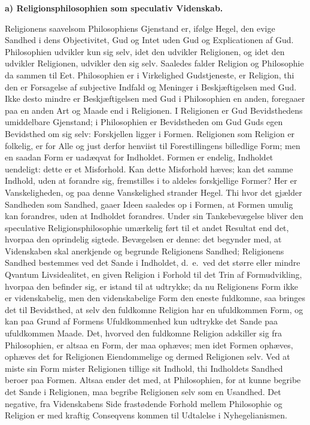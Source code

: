 \documentclass[12pt]{book}
\newcommand{\runhead}[1]{%
  \medskip\begin{center}{\bfseries #1}\end{center}\medskip}
\begin{document}
\runhead{a) Religionsphilosophien som speculativ Videnskab.}

Religionens saavelsom Philosophiens Gjenstand er, ifølge Hegel, den
evige Sandhed i dens Objectivitet, Gud og Intet uden Gud og
Explicationen af Gud. Philosophien udvikler kun sig selv, idet den
udvikler Religionen, og idet den udvikler Religionen, udvikler den
sig selv. Saaledes falder Religion og Philosophie da sammen til Eet.
Philosophien er i Virkelighed Gudstjeneste, er Religion, thi den er
Forsagelse af subjective Indfald og Meninger i Beskjæftigelsen med
Gud. Ikke desto mindre er Beskjæftigelsen med Gud i Philosophien en
anden, foregaaer paa en anden Art og Maade end i Religionen. I
Religionen er Gud Bevidsthedens umiddelbare Gjenstand; i
Philosophien er Bevidstheden om Gud Guds egen Bevidsthed om sig
selv: Forskjellen ligger i Formen. Religionen som Religion er
folkelig, er for Alle og just derfor henviist til Forestillingens
billedlige Form; men en saadan Form er uadæqvat for Indholdet.
Formen er endelig, Indholdet uendeligt: dette er et Misforhold. Kan
dette Misforhold hæves; kan det samme Indhold, uden at
forandre sig, fremstilles i to aldeles forskjellige Former? Her er
Vanskeligheden, og paa denne Vanskelighed strander Hegel. Thi hvor
det gjælder Sandheden som Sandhed, gaaer Ideen saaledes op i Formen,
at Formen umulig kan forandres, uden at Indholdet forandres. Under
sin Tankebevægelse bliver den speculative Religionsphilosophie
umærkelig ført til et andet Resultat end det, hvorpaa den oprindelig
sigtede. Bevægelsen er denne: det begynder med, at Videnskaben skal
anerkjende og begrunde Religionens Sandhed; Religionens Sandhed
bestemmes ved det Sande i Indholdet, d.\ e.\ ved det større eller
mindre Qvantum Livsidealitet, en given Religion i Forhold til det
Trin af Formudvikling, hvorpaa den befinder sig, er istand til at
udtrykke; da nu Religionens Form ikke er videnskabelig, men den
videnskabelige Form den eneste fuldkomne, saa bringes det til
Bevidsthed, at selv den fuldkomne Religion har en ufuldkommen Form,
og kan paa Grund af Formens Ufuldkommenhed kun udtrykke det Sande
paa ufuldkommen Maade. Det, hvorved den fuldkomne Religion adskiller
sig fra Philosophien, er altsaa en Form, der maa ophæves; men idet
Formen ophæves, ophæves det for Religionen Eiendommelige og dermed
Religionen selv. Ved at miste sin Form mister Religionen tillige sit
Indhold, thi Indholdets Sandhed beroer paa Formen. Altsaa ender det
med, at Philosophien, for at kunne begribe det Sande i Religionen,
maa begribe Religionen selv som en Usandhed. Det negative, fra
Videnskabens Side frastødende Forhold mellem Philosophie og Religion
er med kraftig Conseqvens kommen til Udtalelse i Nyhegelianismen.
\end{document}
